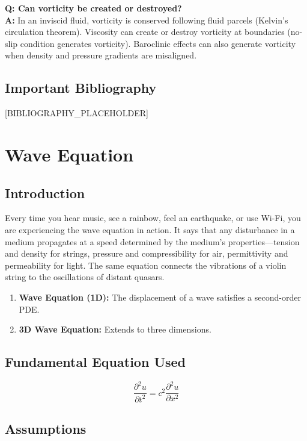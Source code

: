 \documentclass[11pt,openright]{book}
\begin{document}
\textbf{Q: Can vorticity be created or destroyed?}\\
\textbf{A:} In an inviscid fluid, vorticity is conserved following fluid parcels (Kelvin's circulation theorem). Viscosity can create or destroy vorticity at boundaries (no-slip condition generates vorticity). Baroclinic effects can also generate vorticity when density and pressure gradients are misaligned.
\section*{Important Bibliography}

[BIBLIOGRAPHY_PLACEHOLDER]


\chapter{Wave Equation}

\section*{Introduction}

Every time you hear music, see a rainbow, feel an earthquake, or use Wi-Fi, you are experiencing the wave equation in action. It says that any disturbance in a medium propagates at a speed determined by the medium's properties---tension and density for strings, pressure and compressibility for air, permittivity and permeability for light. The same equation connects the vibrations of a violin string to the oscillations of distant quasars.

\begin{enumerate}
\item \textbf{Wave Equation (1D):} The displacement of a wave satisfies a second-order PDE.

\item \textbf{3D Wave Equation:} Extends to three dimensions.

\end{enumerate}
\section*{Fundamental Equation Used}

\[
\frac{\partial^2 u}{\partial t^2} = c^2 \frac{\partial^2 u}{\partial x^2}
\]


\item
\section*{Assumptions}
\end{document}
